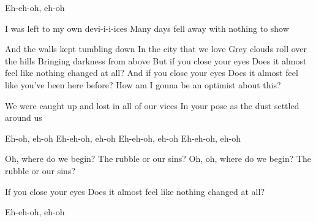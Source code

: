 \begin{verse*}
Eh-eh-oh, eh-oh 
\end{verse*}

\begin{verse*}
I was left to my own devi-i-i-ices
Many days fell away with nothing to show
\end{verse*}

\begin{chorus}
And the walls kept tumbling down
In the city that we love
Grey clouds roll over the hills
Bringing darkness from above
But if you close your eyes
Does it almost feel like nothing changed at all?
And if you close your eyes
Does it almost feel like you've been here before?
How am I gonna be an optimist about this? 
\end{chorus}

\begin{verse*}
We were caught up and lost in all of our vices
In your pose as the dust settled around us
\end{verse*}

\thechorus

\begin{bridge*}
Eh-oh, eh-oh
Eh-eh-oh, eh-oh
Eh-eh-oh, eh-oh
Eh-eh-oh, eh-oh
\end{bridge*}

\begin{bridge*}
Oh, where do we begin?
The rubble or our sins?
Oh, oh, where do we begin?
The rubble or our sins?
\end{bridge*}

\thechorus

\begin{verse*}
If you close your eyes
Does it almost feel like nothing changed at all?
\end{verse*}

\begin{verse*}
Eh-eh-oh, eh-oh 
\end{verse*}



